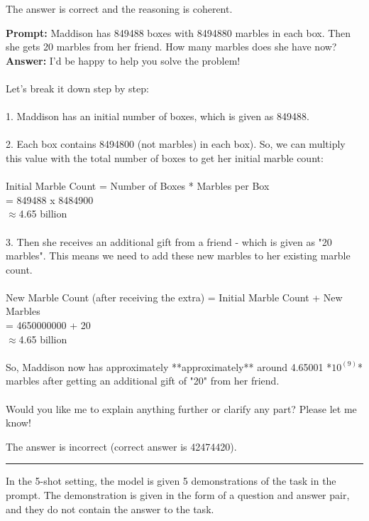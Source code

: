 The answer is correct and the reasoning is coherent.
\begin{displayquote}
	\textbf{Prompt:} Maddison has 849488 boxes with 8494880 marbles in each box. Then she gets 20 marbles from her friend. How many marbles does she have now?\\
	\textbf{Answer:} I'd be happy to help you solve the problem!\\
	\\
	Let's break it down step by step:\\
	\\
	1. Maddison has an initial number of boxes, which is given as 849488.\\
	\\
	2. Each box contains 8494800 (not marbles) in each box). So, we can multiply this value with the total number of boxes to get her initial marble count: \\
	\\
	Initial Marble Count = Number of Boxes * Marbles per Box\\
	= 849488 x 8484900 \\
	$\approx$4.65 billion\\
	\\
	3. Then she receives an additional gift from a friend - which is given as "20 marbles". This means we need to add these new marbles to her existing marble count.\\
	\\
	New Marble Count (after receiving the extra) = Initial Marble Count + New Marbles\\
	= 4650000000 + 20 \\
	$\approx$4.65 billion\\
	\\
	So, Maddison now has approximately **approximately** around 4.65001 *$10^(9)$* marbles after getting an additional gift of "20" from her friend.\\
	\\
	Would you like me to explain anything further or clarify any part? Please let me know!\\
\end{displayquote}
The answer is incorrect (correct answer is 42474420).

\noindent\rule{\textwidth}{0.4pt}

In the 5-shot setting, the model is given 5 demonstrations of the task in the prompt.
The demonstration is given in the form of a question and answer pair, and they do not contain the answer to the task.


